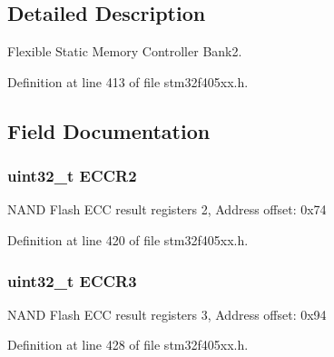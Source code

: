 \subsection{Detailed Description}
Flexible Static Memory Controller Bank2. 

Definition at line 413 of file stm32f405xx.\+h.



\subsection{Field Documentation}
\subsubsection[{\texorpdfstring{E\+C\+C\+R2}{ECCR2}}]{ uint32\+\_\+t E\+C\+C\+R2}\hypertarget{struct_f_s_m_c___bank2__3___type_def_a05a47a1664adc7a3db3fa3e83fe883b4}{}\label{struct_f_s_m_c___bank2__3___type_def_a05a47a1664adc7a3db3fa3e83fe883b4}
N\+A\+ND Flash E\+CC result registers 2, Address offset\+: 0x74 

Definition at line 420 of file stm32f405xx.\+h.

\subsubsection[{\texorpdfstring{E\+C\+C\+R3}{ECCR3}}]{ uint32\+\_\+t E\+C\+C\+R3}\hypertarget{struct_f_s_m_c___bank2__3___type_def_a6062be7dc144c07e01c303cb49d69ce2}{}\label{struct_f_s_m_c___bank2__3___type_def_a6062be7dc144c07e01c303cb49d69ce2}
N\+A\+ND Flash E\+CC result registers 3, Address offset\+: 0x94 

Definition at line 428 of file stm32f405xx.\+h.

